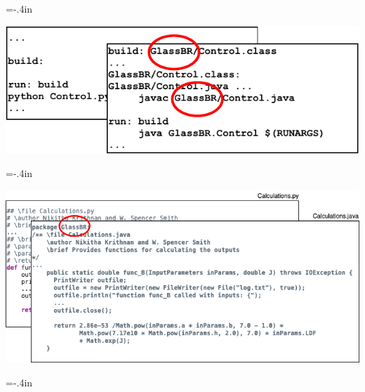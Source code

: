 \documentclass[usenames,dvipsnames]{beamer}
\begin{document}
\hoffset=0in %
\hoffset=-.4in %
\begin{frame}[plain]
  
  
  \includegraphics[width=1.05\textwidth]{MakefileCircleGlassBR.pdf}
  
\end{frame}
\hoffset=0in %
\hoffset=-.4in %
\begin{frame}[plain]
  
  
  \includegraphics[width=1.05\textwidth]{CodeCircleGlassBR.png}
  
\end{frame}
\hoffset=0in %
\hoffset=-.4in %
\end{document}
